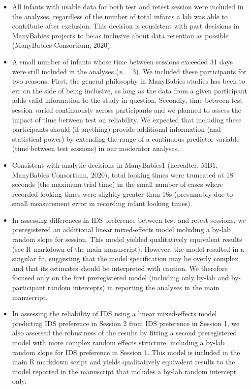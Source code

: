 \documentclass[
  man, donotrepeattitle,floatsintext]{apa6}
\providecommand{\tightlist}{%
  \setlength{\itemsep}{0pt}\setlength{\parskip}{0pt}}
\begin{document}
\begin{itemize}
\tightlist
\item
  All infants with usable data for both test and retest session were included in the analyses, regardless of the number of total infants a lab was able to contribute after exclusion. This decision is consistent with past decisions in ManyBabies projects to be as inclusive about data retention as possible (ManyBabies Consortium, 2020).
\item
  A small number of infants whose time between sessions exceeded 31 days were still included in the analyses (\emph{n} = 3). We included these participants for two reasons. First, the general philosophy in ManyBabies studies has been to err on the side of being inclusive, as long as the data from a given participant adds valid information to the study in question. Secondly, time between test session varied continuously across participants and we planned to assess the impact of time between test on reliability. We expected that including these participants should (if anything) provide additional information (and statistical power) by extending the range of a continuous predictor variable (time between test sessions) in our moderator analyses.
\item
  Consistent with analytic decisions in ManyBabies1 (hereafter, MB1, ManyBabies Consortium, 2020), total looking times were truncated at 18 seconds (the maximum trial time) in the small number of cases where recorded looking times were slightly greater than 18s (presumably due to small measurement error in recording infant looking times).
\item
  In assessing differences in IDS preference between test and retest sessions, we preregistered an additional linear mixed-effects model including a by-lab random slope for session. This model yielded qualitatively equivalent results (see R markdown of the main manuscript). However, the model resulted in a singular fit, suggesting that the model specification may be overly complex and that its estimates should be interpreted with caution. We therefore focused only on the first preregistered model (including only by-lab and by-participant random intercepts) in reporting the analyses in the main manuscript.
\item
  In assessing the reliability of IDS using a linear mixed-effects model predicting IDS preference in Session 2 from IDS preference in Session 1, we also assessed the robustness of the results by fitting a second preregistered model with more complex random effects structure, including a by-lab random slope for IDS preference in Session 1. This model is included in the main R markdown script and yields qualitatively equivalent results to the model reported in the manuscript that includes a by-lab random intercept only.

\end{itemize}
\end{document}

